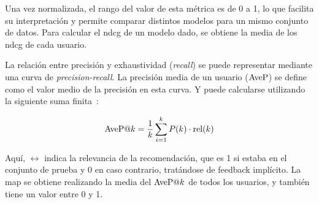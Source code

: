 Una vez normalizada, el rango del valor de esta métrica es de 0 a 1, lo que facilita su interpretación y permite comparar distintos modelos para un mismo conjunto de datos. Para calcular el \gls{ndcg} de un modelo dado, se obtiene la media de los \gls{ndcg} de cada usuario.

La relación entre precisión y exhaustividad (\textit{recall}) se puede representar mediante una curva de \textit{precision-recall}. La precisión media de un usuario ($\text{AveP}$) se define como el valor medio de la precisión en esta curva. Y puede calcularse utilizando la siguiente suma finita~\cite{manning_chapter_2008}:

\begin{equation}
    \AveP@k = \frac{1}{k} \sum_{i=1}^k P(k)\cdot \rel(k)
\end{equation}

Aquí, $\rel$ indica la relevancia de la recomendación, que es 1 si estaba en el conjunto de prueba y 0 en caso contrario, tratándose de feedback implícito. La \acrfull{map} se obtiene realizando la media del $\AveP@k$ de todos los usuarios, y también tiene un valor entre 0 y 1.


